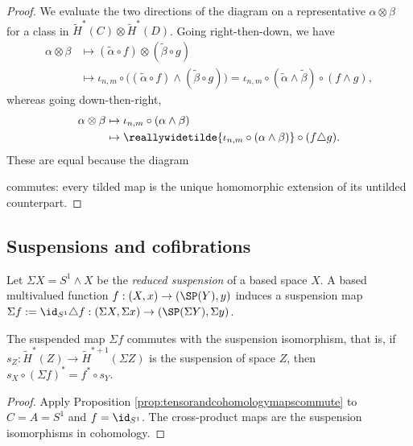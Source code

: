 \begin{proof}
    We evaluate the two directions of the diagram on a representative $\alpha\otimes \beta$ for a class in $\widetilde{H}^*(C)\otimes \widetilde{H}^*(D)$. Going right-then-down, we have
    \begin{align*}
        \alpha\otimes \beta &\mapsto (\widetilde{\alpha}\circ f )\otimes (\widetilde{\beta}\circ g)\\
        &\mapsto \iota_{n,m}\circ \big((\widetilde{\alpha}\circ f)\wedge (\widetilde{\beta}\circ g)\big)=\iota_{n,m}\circ (\widetilde{\alpha}\wedge \widetilde{\beta})\circ (f\wedge g),
    \end{align*}
    whereas going down-then-right,
        \begin{align*}
        \alpha\otimes \beta &\mapsto \iota_{n,m}\circ ({\alpha}\wedge {\beta})\\
        & \mapsto \reallywidetilde{\iota_{n,m}\circ ({\alpha}\wedge {\beta})}\circ (f\triangle g).
    \end{align*}
    These are equal because the diagram 
    \begin{center}
    \end{center}
    commutes: every tilded map is the unique homomorphic extension of its untilded counterpart.
\end{proof}

\subsection{Suspensions and cofibrations}
Let $\Sigma X=S^1\wedge X$ be the \textit{reduced suspension} of a based space $X$. A based multivalued function $f:(X,x)\to (\SP(Y),y)$ induces a suspension map $\Sigma f:=\id_{S^1}\triangle f:(\Sigma X,\Sigma x)\to (\SP(\Sigma Y),\Sigma y)$.
\begin{corollary}\label{cor:fstarwithsuspensions}
    The suspended map $\Sigma f$ commutes with the suspension isomorphism, that is, if $s_Z:\widetilde{H}^*(Z)\to \widetilde{H}^{*+1}(\Sigma Z)$ is the suspension of space $Z$, then $s_X\circ (\Sigma f)^*=f^*\circ s_Y$. 
\end{corollary}
\begin{proof}
    Apply Proposition \ref{prop:tensorandcohomologymapscommute} to $C=A=S^1$ and $f=\id_{S^1}$. The cross-product maps are the suspension isomorphisms in cohomology.
\end{proof}

